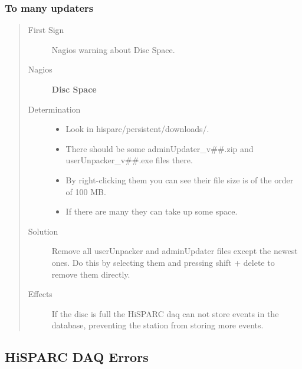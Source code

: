 \documentclass[a4paper,11pt,english]{sphinxmanual}
\begin{document}
\subsubsection{To many updaters}
\label{known-issues:to-many-updaters}\begin{quote}\begin{description}
\item[{First Sign}] \leavevmode
Nagios warning about Disc Space.

\item[{Nagios}] \leavevmode
\textbf{Disc Space}

\item[{Determination}] \leavevmode\begin{itemize}
\item {} 
Look in hisparc/persistent/downloads/.

\item {} 
There should be some adminUpdater\_v\#\#.zip and userUnpacker\_v\#\#.exe files there.

\item {} 
By right-clicking them you can see their file size is of the order of 100 MB.

\item {} 
If there are many they can take up some space.

\end{itemize}

\item[{Solution}] \leavevmode
Remove all userUnpacker and adminUpdater files except the newest ones. Do this by selecting them and pressing shift + delete to remove them directly.

\item[{Effects}] \leavevmode
If the disc is full the HiSPARC daq can not store events in the database, preventing the station from storing more events.

\end{description}\end{quote}


\subsection{HiSPARC DAQ Errors}
\label{known-issues:hisparc-daq-errors}
\end{document}
